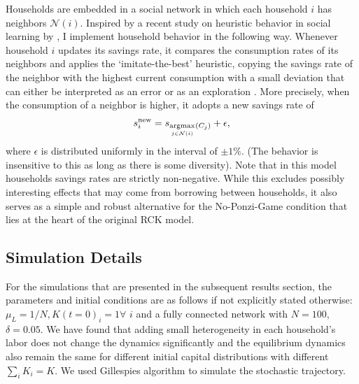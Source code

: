 Households are embedded in a social network in which each household $i$ has neighbors $\mathcal{N}(i)$. Inspired by a recent study on heuristic behavior in social learning by \cite{Barkoczi2016}, I implement household behavior in the following way. Whenever household $i$ updates its savings rate, it compares the consumption rates of its neighbors and applies the `imitate-the-best' heuristic, copying the savings rate of the neighbor with the highest current consumption with a small deviation that can either be interpreted as an error or as an exploration \cite{Mehlhorn2015}. More precisely, when the consumption of a neighbor is higher, it adopts a new savings rate of
\begin{equation} 
	s^\mathrm{new}_i = s_{\underset{j\in \mathcal{N}(i)}{\operatorname*{argmax}}_{} (C_j)} + \epsilon,
\end{equation}
where $\epsilon$ is distributed uniformly in the interval of $\pm 1\%$. (The behavior is insensitive to this as long as there is some diversity).
Note that in this model households savings rates are strictly non-negative. While this excludes possibly interesting effects that may come from borrowing between households, it  also serves as a simple and robust alternative for the No-Ponzi-Game condition that lies at the heart of the original RCK model. 

\subsection{Simulation Details}

For the simulations that are presented in the subsequent results section, the parameters and initial conditions are as follows if not explicitly stated otherwise:
$\mu_L = 1/N, K(t=0)_i \!= \!1 \forall\,\, i$ and a fully connected network with $N=100$, $\delta=0.05$. We have found that adding small heterogeneity in each household's labor does not change the dynamics significantly and the equilibrium dynamics also remain the same for different initial capital distributions with different $\sum_i K_i = K$. We used Gillespies algorithm \citep{Gillespie1977} to simulate the stochastic trajectory.

